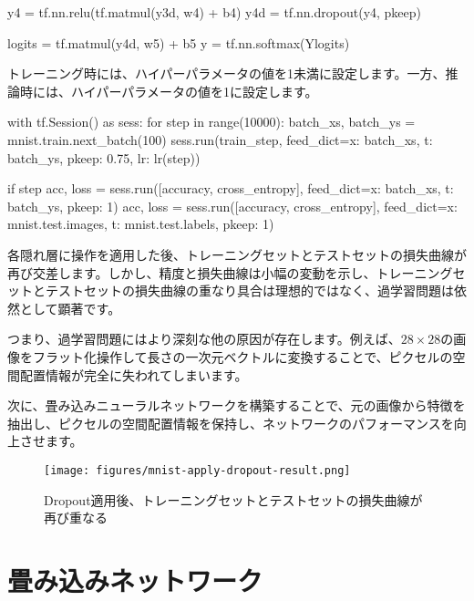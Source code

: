 \begin{content}
\begin{content}
\begin{leftbar}
\begin{python}
y4 = tf.nn.relu(tf.matmul(y3d, w4) + b4)
y4d = tf.nn.dropout(y4, pkeep)

logits = tf.matmul(y4d, w5) + b5
y = tf.nn.softmax(Ylogits)
\end{python}
\end{leftbar}

トレーニング時には、ハイパーパラメータの値を1未満に設定します。一方、推論時には、ハイパーパラメータの値を1に設定します。

\begin{leftbar}
\begin{python}
with tf.Session() as sess:
  for step in range(10000):
    batch_xs, batch_ys = mnist.train.next_batch(100)
    sess.run(train_step, 
      feed_dict={x: batch_xs, t: batch_ys, pkeep: 0.75, lr: lr(step)})

    if step %
      acc, loss = sess.run([accuracy, cross_entropy], 
        feed_dict={x: batch_xs, t: batch_ys, pkeep: 1})
      acc, loss = sess.run([accuracy, cross_entropy], 
        feed_dict={x: mnist.test.images, t: mnist.test.labels, pkeep: 1})
\end{python}
\end{leftbar}

各隠れ層に操作を適用した後、トレーニングセットとテストセットの損失曲線が再び交差します。しかし、精度と損失曲線は小幅の変動を示し、トレーニングセットとテストセットの損失曲線の重なり具合は理想的ではなく、過学習問題は依然として顕著です。

つまり、過学習問題にはより深刻な他の原因が存在します。例えば、$ 28 \times 28 $の画像をフラット化操作して長さの一次元ベクトルに変換することで、ピクセルの空間配置情報が完全に失われてしまいます。

次に、畳み込みニューラルネットワークを構築することで、元の画像から特徴を抽出し、ピクセルの空間配置情報を保持し、ネットワークのパフォーマンスを向上させます。

\begin{figure}[H]
\centering
\texttt{[image: figures/mnist-apply-dropout-result.png]}
\caption{Dropout適用後、トレーニングセットとテストセットの損失曲線が再び重なる}
 \label{fig:mnist-apply-dropout-result}
\end{figure}

\end{content}

\section{畳み込みネットワーク}


\end{content}
